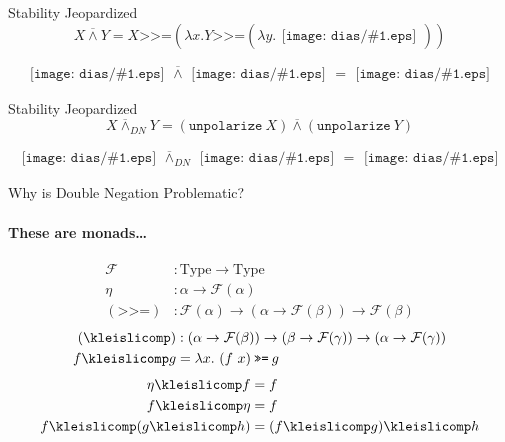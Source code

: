 \documentclass{beamer}
\newcommand{\dand}{\mathbin{\overline{\land}}}
\newcommand{\hsbind}{\mathbin{\texttt{>>=}}}
\newcommand{\includepicturescale}[2]{
    \texttt{[image: dias/\#1.eps]}
}
\begin{document}
\begin{frame}{Stability Jeopardized}
  $$X \dand Y = X \hsbind \left(\lambda x. Y \hsbind \left(\lambda y. \begin{array}{l}\includepicturescale{conj}{0.5}\end{array}\right)\right)$$
  \vfill
  \begin{adjustbox}{center}
  $$\begin{array}{l}\includepicturescale{double_negation}{0.27}\end{array} \dand \begin{array}{l}\includepicturescale{A}{0.27}\end{array} = \begin{array}{l}\includepicturescale{double_negation_A}{0.27}\end{array}$$
  \end{adjustbox}
\end{frame}

\begin{frame}{Stability Jeopardized}
  $$X \dand_{DN} Y = (\texttt{unpolarize}\ X) \dand (\texttt{unpolarize}\ Y)$$ 
  \vfill
  \begin{adjustbox}{center}
  $$\begin{array}{l}\includepicturescale{double_negation}{0.33}\end{array} \dand_{DN} \begin{array}{l}\includepicturescale{A}{0.33}\end{array} = \begin{array}{l}\includepicturescale{negation}{0.33}\end{array}$$
  \end{adjustbox}
\end{frame}

\begin{frame}{Why is Double Negation Problematic?}
  \framesubtitle{These are monads\ldots}

  \begin{align*}
    \mathcal{F} &: \text{Type} \to \text{Type} \\
    \eta &: \alpha \to \mathcal{F}(\alpha) \\
    (\hsbind) &: \mathcal{F}(\alpha) \to (\alpha \to \mathcal{F}(\beta)) \to \mathcal{F}(\beta)
  \end{align*}
  \vfill
  \pause
  \begin{align*}
    (\kleislicomp) &: (\alpha \to \mathcal{F}(\beta)) \to (\beta \to \mathcal{F}(\gamma)) \to (\alpha \to \mathcal{F}(\gamma)) \\
    f \kleislicomp g &= \lambda x.\ (f\ x) \hsbind g
  \end{align*}
  \vfill
  \pause
  \begin{align*}
    \eta \kleislicomp f &= f \\
    f \kleislicomp \eta &= f \\
    f \kleislicomp (g \kleislicomp h) &= (f \kleislicomp g) \kleislicomp h
  \end{align*}
\end{frame}
\end{document}
